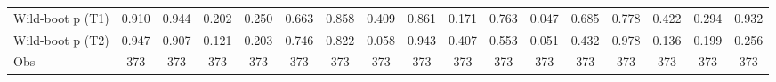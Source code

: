 {\begin{tabular}{l*{16}{c}}
Wild-boot p (T1)    &       0.910         &       0.944         &       0.202         &       0.250         &       0.663         &       0.858         &       0.409         &       0.861         &       0.171         &       0.763         &       0.047         &       0.685         &       0.778         &       0.422         &       0.294         &       0.932         \\
Wild-boot p (T2)    &       0.947         &       0.907         &       0.121         &       0.203         &       0.746         &       0.822         &       0.058         &       0.943         &       0.407         &       0.553         &       0.051         &       0.432         &       0.978         &       0.136         &       0.199         &       0.256         \\
Obs                 &         373         &         373         &         373         &         373         &         373         &         373         &         373         &         373         &         373         &         373         &         373         &         373         &         373         &         373         &         373         &         373         \\
\bottomrule
\end{tabular}
}
